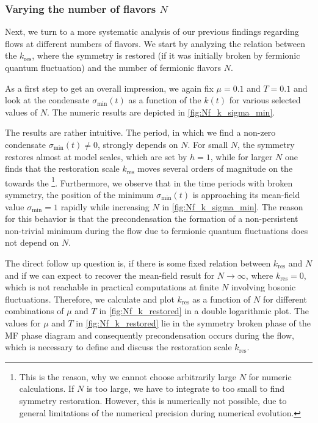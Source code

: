 \subsubsection{Varying the number of flavors \texorpdfstring{$N$}{N}}\label{subsubsec:variableN}
Next, we turn to a more systematic analysis of our previous findings regarding \frg{} flows at different numbers of flavors. We start by analyzing the relation between the \rgscale{} $k_\mathrm{res}$, where the \ZII{} symmetry is restored (if it was initially broken by fermionic quantum fluctuation) and the number of fermionic flavors $N$.\bigskip
	
As a first step to get an overall impression, we again fix $\mu = 0.1$ and $T = 0.1$ and look at the condensate $\sigma_\mathrm{min} ( t )$ as a function of the \rgscale{} $k ( t )$ for various selected values of $N$. The numeric results are depicted in \cref{fig:Nf_k_sigma_min}.

The results are rather intuitive. The \rgtime{} period, in which we find a non-zero condensate ${\sigma_\mathrm{min} ( t ) \neq 0}$, strongly depends on $N$. For small $N$, the \ZII{} symmetry restores almost at model scales, which are set by $h = 1$, while for larger $N$ one finds that the restoration scale $k_\mathrm{res}$ moves several orders of magnitude on the \rgscale{} towards the \ir{}\footnote{This is the reason, why we cannot choose arbitrarily large $N$ for numeric calculations. If $N$ is too large, we have to integrate to too small \rgscales{} to find symmetry restoration. However, this is numerically not possible, due to general limitations of the numerical precision during numerical \rgtime{} evolution.}. Furthermore, we observe that in the time periods with broken \ZII{} symmetry, the position of the minimum $\sigma_\mathrm{min} ( t )$ is approaching its mean-field value ${\sigma_\mathrm{min} = 1}$ rapidly while increasing $N$ in \cref{fig:Nf_k_sigma_min}. The reason for this behavior is that the precondensation \dash{} the formation of a non-persistent non-trivial minimum during the \frg{} flow \dash{} due to fermionic quantum fluctuations does not depend on $N$.\bigskip

The direct follow up question is, if there is some fixed relation between $k_\mathrm{res}$ and $N$ and if we can expect to recover the mean-field result for $N \rightarrow \infty$, where $k_\mathrm{res} = 0$, which is not reachable in practical computations at finite $N$ involving bosonic fluctuations. Therefore, we calculate and plot $k_\mathrm{res}$ as a function of $N$ for different combinations of $\mu$ and $T$ in \cref{fig:Nf_k_restored} in a double logarithmic plot. The values for $\mu$ and $T$ in \cref{fig:Nf_k_restored} lie in the symmetry broken phase of the MF phase diagram and consequently precondensation occurs during the \frg{} flow, which is necessary to define and discuss the restoration scale $k_\mathrm{res}$.

